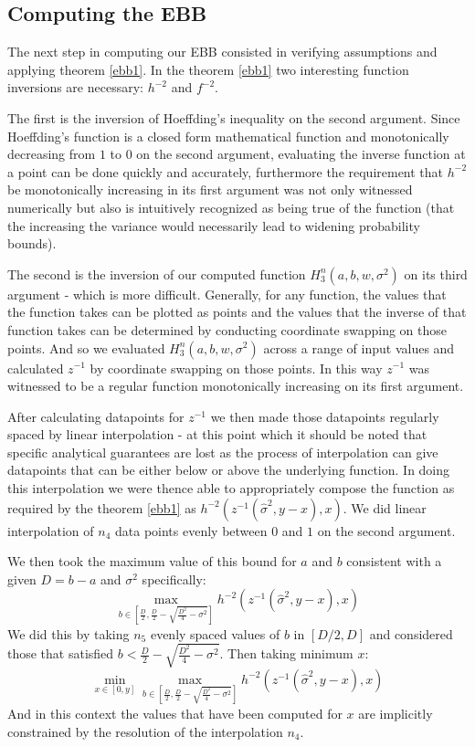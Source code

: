 \documentclass[aap,preprint]{imsart}
\begin{document}
\subsection{Computing the EBB}
The next step in computing our EBB consisted in verifying assumptions and applying theorem \ref{ebb1}.
In the theorem \ref{ebb1} two interesting function inversions are necessary: $h^{-2}$ and $f^{-2}$.

The first is the inversion of Hoeffding's inequality on the second argument. Since Hoeffding's function is a closed form mathematical function and monotonically decreasing from $1$ to $0$ on the second argument, evaluating the inverse function at a point can be done quickly and accurately, furthermore the requirement that $h^{-2}$ be monotonically increasing in its first argument was not only witnessed numerically but also is intuitively recognized as being true of the function (that the increasing the variance would necessarily lead to widening probability bounds).

The second is the inversion of our computed function $H_3^n(a,b,w,\sigma^2)$ on its third argument - which is more difficult.
Generally, for any function, the values that the function takes can be plotted as points and the values that the inverse of that function takes can be determined by conducting coordinate swapping on those points. And so we evaluated $H_3^n(a,b,w,\sigma^2)$ across a range of input values and calculated $z^{-1}$ by coordinate swapping on those points. In this way $z^{-1}$ was witnessed to be a regular function monotonically increasing on its first argument.

After calculating datapoints for $z^{-1}$ we then made those datapoints regularly spaced by linear interpolation - at this point which it should be noted that specific analytical guarantees are lost as the process of interpolation can give datapoints that can be either below or above the underlying function.
In doing this interpolation we were thence able to appropriately compose the function as required by the theorem \ref{ebb1} as $h^{-2}(z^{-1}(\hat{\sigma}^2,y-x),x)$.
We did linear interpolation of $n_4$ data points evenly between $0$ and $1$ on the second argument.

We then took the maximum value of this bound for $a$ and $b$ consistent with a given $D=b-a$ and $\sigma^2$ specifically:
$$\max_{b\in\left[\frac{D}{2},\frac{D}{2}-\sqrt{\frac{D^2}{4}-\sigma^2}\right]} h^{-2}(z^{-1}(\hat{\sigma}^2,y-x),x)$$
We did this by taking $n_5$ evenly spaced values of $b$ in $\left[D/2,D\right]$ and considered those that satisfied $b<\frac{D}{2}-\sqrt{\frac{D^2}{4}-\sigma^2}$.
Then taking minimum $x$:
$$\min_{x\in[0,y]}\max_{b\in\left[\frac{D}{2},\frac{D}{2}-\sqrt{\frac{D^2}{4}-\sigma^2}\right]} h^{-2}(z^{-1}(\hat{\sigma}^2,y-x),x)$$
And in this context the values that have been computed for $x$ are implicitly constrained by the resolution of the interpolation $n_4$.
\end{document}
